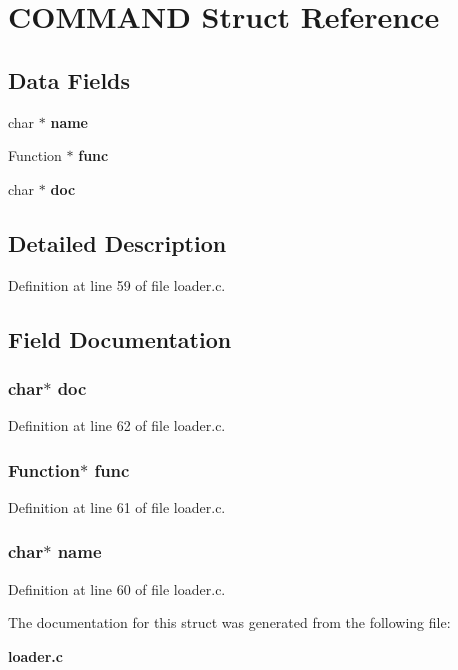\section{COMMAND Struct Reference}
\label{struct_c_o_m_m_a_n_d}
\subsection*{Data Fields}
\begin{DoxyCompactItemize}
\item 
char $\ast$ {\bf name}
\item 
Function $\ast$ {\bf func}
\item 
char $\ast$ {\bf doc}
\end{DoxyCompactItemize}


\subsection{Detailed Description}


Definition at line 59 of file loader.c.



\subsection{Field Documentation}
\subsubsection[{doc}]{\setlength{\rightskip}{0pt plus 5cm}char$\ast$ {\bf doc}}\label{struct_c_o_m_m_a_n_d_a7ea52c0c994d7e75db8c3dc0c33dcbec}


Definition at line 62 of file loader.c.

\subsubsection[{func}]{\setlength{\rightskip}{0pt plus 5cm}Function$\ast$ {\bf func}}\label{struct_c_o_m_m_a_n_d_a6dfb96ce566d22ba4b947f9dfaadbcc8}


Definition at line 61 of file loader.c.

\subsubsection[{name}]{\setlength{\rightskip}{0pt plus 5cm}char$\ast$ {\bf name}}\label{struct_c_o_m_m_a_n_d_a5ac083a645d964373f022d03df4849c8}


Definition at line 60 of file loader.c.



The documentation for this struct was generated from the following file:\begin{DoxyCompactItemize}
\item 
{\bf loader.c}\end{DoxyCompactItemize}
